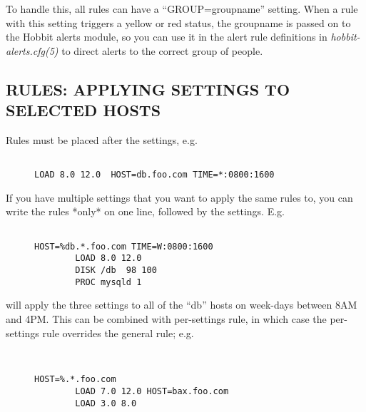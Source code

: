   To handle this, all rules can have a ``GROUP=groupname'' setting. When a rule with this setting triggers a yellow or red status, the groupname is passed on to the Hobbit alerts module, so you can use it in the alert rule definitions in \emph{hobbit-alerts.cfg(5)}
 to direct alerts to the correct group of people. 



 
\subsection{RULES: APPLYING SETTINGS TO SELECTED HOSTS}
 Rules must be placed after the settings, e.g. \begin{description}
\item[]\begin{verbatim}

LOAD 8.0 12.0  HOST=db.foo.com TIME=*:0800:1600

\end{verbatim}


\end{description}



  If you have multiple settings that you want to apply the same rules
  to, you can write the rules *only* on one line, followed by the
  settings. E.g. 

\begin{description}
\item[]\begin{verbatim}

HOST=%db.*.foo.com TIME=W:0800:1600
        LOAD 8.0 12.0
        DISK /db  98 100
        PROC mysqld 1

\end{verbatim}


\end{description}



  will apply the three settings to all of the ``db'' hosts on
  week-days between 8AM and 4PM. This can be combined with
  per-settings rule, in which case the per-settings rule overrides the
  general rule; e.g. \begin{description}\item[]\begin{verbatim}


HOST=%.*.foo.com
        LOAD 7.0 12.0 HOST=bax.foo.com
        LOAD 3.0 8.0

\end{verbatim}


\end{description}




